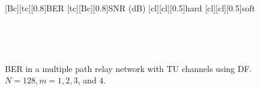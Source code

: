 \begin{figure}
    [Bc][tc][0.8]{BER}
    [tc][Bc][0.8]{SNR (dB)}
    [cl][cl][0.5]{hard}
    [cl][cl][0.5]{soft}

\centerline{
	 \\
}
\centerline{
	 \\
}
\caption{BER in a multiple path relay network with TU channels using DF.  $N = 128, m = 1, 2, 3$, and $4$.}
\label{fig:mp_df_ber_plots_TU}
\end{figure}

